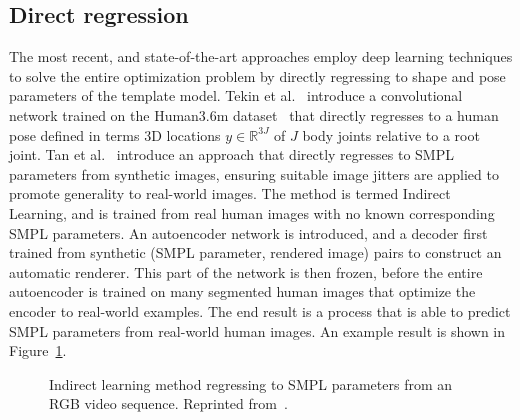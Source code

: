         
\subsection{Direct regression}
The most recent, and state-of-the-art approaches employ deep learning techniques to solve the entire optimization problem by directly regressing to shape and pose parameters of the template model. Tekin et al.~\cite{tekin2016direct} introduce a convolutional network trained on the Human3.6m dataset~\cite{lin2014microsoft} that directly regresses to a human pose defined in terms 3D locations $y \in \mathbb{R}^{3J}$ of $J$ body joints relative to a root joint. Tan et al.~\cite{tan17indirect} introduce an approach that directly regresses to SMPL parameters from synthetic images, ensuring suitable image jitters are applied to promote generality to real-world images. The method is termed Indirect Learning, and is trained from real human images with no known corresponding SMPL parameters. An autoencoder network is introduced, and a decoder first trained from synthetic (SMPL parameter, rendered image) pairs to construct an automatic renderer. This part of the network is then frozen, before the entire autoencoder is trained on many segmented human images that optimize the encoder to real-world examples. The end result is a process that is able to predict SMPL parameters from real-world human images. An example result is shown in Figure~\ref{fig:indirect_learning}.

\begin{figure}[H] %
    \caption{Indirect learning method regressing to SMPL parameters from an RGB video sequence. Reprinted from~\cite{tan17indirect}.}
    \label{fig:indirect_learning}
\end{figure}

